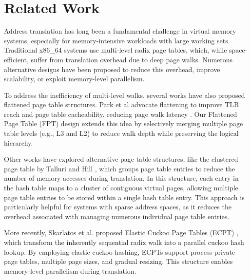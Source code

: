 \section{Related Work}

Address translation has long been a fundamental challenge in virtual memory systems, especially for memory-intensive workloads with large working sets. Traditional x86\_64 systems use multi-level radix page tables, which, while space-efficient, suffer from translation overhead due to deep page walks. Numerous alternative designs have been proposed to reduce this overhead, improve scalability, or exploit memory-level parallelism.

To address the inefficiency of multi-level walks, several works have also proposed flattened page table structures. Park et al advocate flattening to improve TLB reach and page table cacheability, reducing page walk latency \cite{every_walks_a_hit}. Our Flattened Page Table (FPT) design extends this idea by selectively merging multiple page table levels (e.g., L3 and L2) to reduce walk depth while preserving the logical hierarchy.

Other works have explored alternative page table structures, like the clustered page table by Talluri and Hill \cite{clustered}, which groups page table entries to reduce the number of memory accesses during translation. In this structure, each entry in the hash table maps to a cluster of contiguous virtual pages, allowing multiple page table entries to be stored within a single hash table entry. This approach is particularly helpful for systems with sparse address spaces, as it reduces the overhead associated with managing numerous individual page table entries.

More recently, Skarlatos et al. proposed Elastic Cuckoo Page Tables (ECPT) \cite{ecpt}, which transform the inherently sequential radix walk into a parallel cuckoo hash lookup. By employing elastic cuckoo hashing, ECPTs support process-private page tables, multiple page sizes, and gradual resizing. This structure enables memory-level parallelism during translation.

